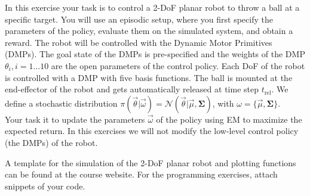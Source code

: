 \newif\ifvimbug
\vimbugfalse

\ifvimbug

\fi


In this exercise your task is to control a 2-DoF planar robot to throw a ball at a specific target. You will use an episodic setup, where you first specify the parameters of the policy, evaluate them on the simulated system, and obtain a reward. The robot will be controlled with the Dynamic Motor Primitives (DMPs).
The goal state of the DMPs is pre-specified and the weights of the DMP
$\theta_i, i = 1 \ldots 10$ are the open parameters of the control policy. Each DoF of the robot is controlled with a DMP with five basis functions. The ball is mounted at the end-effector of the robot and gets automatically released at time step $t_{\textrm{rel}}$.
We define a stochastic distribution $\pi(\vec{\theta}|\vec{\omega}) =
\mathcal{N}(\vec{\theta}|\vec{\mu},\boldsymbol{\Sigma})$, with $\omega = \{\vec{\mu},\boldsymbol{\Sigma} \}$. \\
Your task it to update the parameters $\vec{\omega}$ of the policy using EM to maximize the expected return. In this exercises we will not
modify the low-level control policy (the DMPs) of the robot. 

A template for the simulation of the 2-DoF planar robot and plotting functions can be found at the course website. For the programming exercises, attach snippets of your code.

